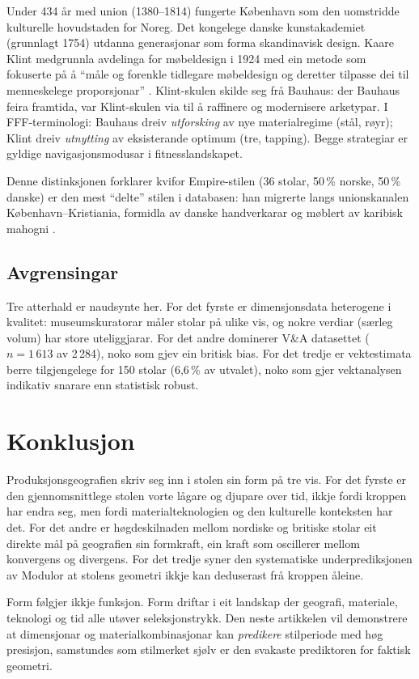 \documentclass[10pt, a4paper, twocolumn]{article}
\begin{document}
Under 434 år med union (1380--1814) fungerte København som den uomstridde kulturelle hovudstaden for Noreg. Det kongelege danske kunstakademiet (grunnlagt 1754) utdanna generasjonar som forma skandinavisk design. Kaare Klint medgrunnla avdelinga for møbeldesign i 1924 med ein metode som fokuserte på å ``måle og forenkle tidlegare møbeldesign og deretter tilpasse dei til menneskelege proporsjonar'' \citep{sparke2004}. Klint-skulen skilde seg frå Bauhaus: der Bauhaus feira framtida, var Klint-skulen via til å raffinere og modernisere arketypar. I FFF-terminologi: Bauhaus dreiv \emph{utforsking} av nye materialregime (stål, røyr); Klint dreiv \emph{utnytting} av eksisterande optimum (tre, tapping). Begge strategiar er gyldige navigasjonsmodusar i fitnesslandskapet.

Denne distinksjonen forklarer kvifor Empire-stilen (36 stolar, 50\,\% norske, 50\,\% danske) er den mest ``delte'' stilen i databasen: han migrerte langs unionskanalen København--Kristiania, formidla av danske handverkarar og møblert av karibisk mahogni \citep{anderson2012}.

\subsection{Avgrensingar}

Tre atterhald er naudsynte her. For det fyrste er dimensjonsdata heterogene i kvalitet: museumskuratorar måler stolar på ulike vis, og nokre verdiar (særleg volum) har store uteliggjarar. For det andre dominerer V\&A datasettet ($n = 1\,613$ av 2\,284), noko som gjev ein britisk bias. For det tredje er vektestimata berre tilgjengelege for 150 stolar (6,6\,\% av utvalet), noko som gjer vektanalysen indikativ snarare enn statistisk robust.


\section{Konklusjon}

Produksjonsgeografien skriv seg inn i stolen sin form på tre vis. For det fyrste er den gjennomsnittlege stolen vorte lågare og djupare over tid, ikkje fordi kroppen har endra seg, men fordi materialteknologien og den kulturelle konteksten har det. For det andre er høgdeskilnaden mellom nordiske og britiske stolar eit direkte mål på geografien sin formkraft, ein kraft som oscillerer mellom konvergens og divergens. For det tredje syner den systematiske underprediksjonen av Modulor at stolens geometri ikkje kan deduserast frå kroppen åleine.

Form følgjer ikkje funksjon. Form driftar i eit landskap der geografi, materiale, teknologi og tid alle utøver seleksjonstrykk. Den neste artikkelen vil demonstrere at dimensjonar og materialkombinasjonar kan \emph{predikere} stilperiode med høg presisjon, samstundes som stilmerket sjølv er den svakaste prediktoren for faktisk geometri.


\newpage
\onecolumn


\end{document}
